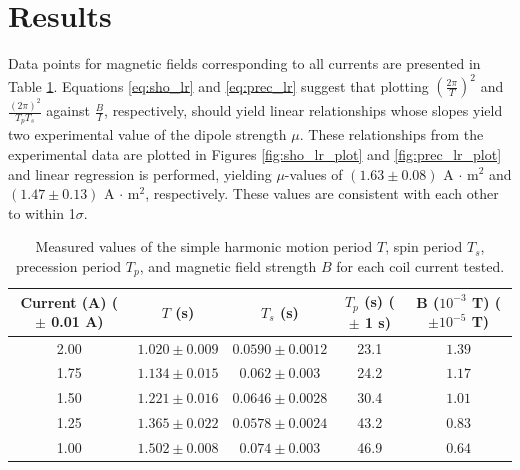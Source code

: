 \documentclass[11pt]{article}
\begin{document}
\section{Results}

Data points for magnetic fields corresponding to all currents are
presented in Table \ref{tab:results}. Equations \eqref{eq:sho_lr} and
\eqref{eq:prec_lr} suggest that plotting $\left ( \frac{2\pi}{T} \right )^2$
and $ \frac{(2\pi)^2}{T_p T_s}$ against $\frac{B}{I}$,
respectively,
should yield linear relationships whose slopes yield two experimental
value of the dipole
strength $\mu$. These relationships from the experimental data are plotted
in Figures \ref{fig:sho_lr_plot} and \ref{fig:prec_lr_plot} and
linear regression is performed, yielding $\mu$-values of
$(1.63 \pm 0.08)$ A $\cdot$ m$^2$ and $(1.47 \pm 0.13)$ A $\cdot$
m$^2$, respectively. These values are consistent with each other to
within 1$\sigma$.


\begin{table}[H]
  \centering
  \begin{tabular}{c c c c c}
    \hline
    Current (A) ($\pm$ 0.01 A) & $T$ (s) & $T_s$ (s) &
    $T_p$ (s) ($\pm$ 1 s) & B ($10^{-3}$ T) ($\pm 10^{-5}$ T) \\
    \hline
    2.00 & $1.020 \pm 0.009$ & $0.0590 \pm 0.0012$ & 23.1 & $1.39
    $ \\
    1.75 & $1.134 \pm 0.015$ & $0.062 \pm 0.003$ & 24.2 & $1.17 $ \\
    1.50 & $1.221 \pm 0.016$ & $0.0646 \pm 0.0028$ & 30.4 & $1.01
    $ \\
    1.25 & $1.365 \pm 0.022$ & $0.0578 \pm 0.0024$ & 43.2 & $0.83
    $ \\
    1.00 & $1.502 \pm 0.008$ & $0.074 \pm 0.003$ & 46.9 & $0.64
    $ \\
    \hline
  \end{tabular}
  \caption{Measured values of the simple harmonic motion period $T$,
    spin period $T_s$, precession period $T_p$, and magnetic field strength $B$
  for each coil current tested.}
  \label{tab:results}
\end{table}
\end{document}
